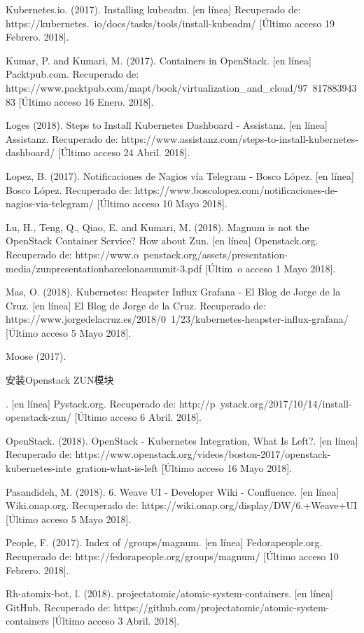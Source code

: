 Kubernetes.io. (2017). Installing kubeadm. [en línea] Recuperado de: https://kubernetes.\ io/docs/tasks/tools/install-kubeadm/ [Último acceso 19 Febrero. 2018].

Kumar, P. and Kumari, M. (2017). Containers in OpenStack. [en línea] Packtpub.com. Recuperado de: https://www.packtpub.com/mapt/book/virtualization\_and\_cloud/97\ 81788394383 [Último acceso 16 Enero. 2018].

Loges (2018). Steps to Install Kubernetes Dashboard - Assistanz. [en línea] Assistanz. Recuperado de: https://www.assistanz.com/steps-to-install-kubernetes-dashboard/ [Último acceso 24 Abril. 2018].

Lopez, B. (2017). Notificaciones de Nagios vía Telegram - Bosco López. [en línea] Bosco López. Recuperado de: https://www.boscolopez.com/notificaciones-de-nagios-via-telegram/ [Último acceso 10 Mayo 2018].


Lu, H., Teng, Q., Qiao, E. and Kumari, M. (2018). Magnum is not the OpenStack Container Service? How about Zun. [en línea] Openstack.org. Recuperado de: https://www.o\ penstack.org/assets/presentation-media/zunpresentationbarcelonasummit-3.pdf [Últim\ o acceso 1 Mayo 2018].

Mas, O. (2018). Kubernetes: Heapster Influx Grafana - El Blog de Jorge de la Cruz. [en línea] El Blog de Jorge de la Cruz. Recuperado de: https://www.jorgedelacruz.es/2018/0\ 1/23/kubernetes-heapster-influx-grafana/ [Último acceso 5 Mayo 2018].

Moose (2017). \begin{CJK*}{UTF8}{gbsn}安装Openstack ZUN模块\end{CJK*}. [en línea] Pystack.org. Recuperado de: http://p\ ystack.org/2017/10/14/install-openstack-zun/ [Último acceso 6 Abril. 2018].

OpenStack. (2018). OpenStack - Kubernetes Integration, What Is Left?. [en línea] Recuperado de: https://www.openstack.org/videos/boston-2017/openstack-kubernetes-inte\ gration-what-is-left [Último acceso 16 Mayo 2018].

Pasandideh, M. (2018). 6. Weave UI - Developer Wiki - Confluence. [en línea] Wiki.onap.org. Recuperado de: https://wiki.onap.org/display/DW/6.+Weave+UI [Último acceso 5 Mayo 2018].

People, F. (2017). Index of /groups/magnum. [en línea] Fedorapeople.org. Recuperado de: https://fedorapeople.org/groups/magnum/ [Último acceso 10 Febrero. 2018].

Rh-atomix-bot, l. (2018). projectatomic/atomic-system-containers. [en línea] GitHub. Recuperado de: https://github.com/projectatomic/atomic-system-containers [Último acceso 3 Abril. 2018].

